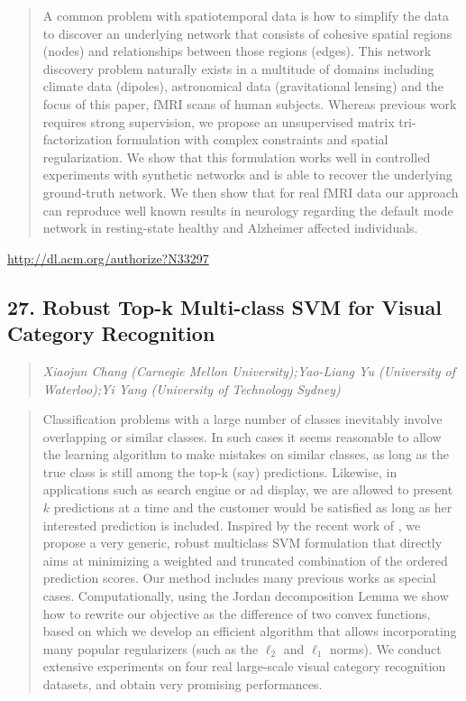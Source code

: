 \documentclass{article}
\begin{document}
\begin{quote}
A common problem with spatiotemporal data is how to simplify the data to discover an underlying network that consists of cohesive spatial regions (nodes) and relationships between those regions (edges). This network discovery problem naturally exists in a multitude of domains including climate data (dipoles), astronomical data (gravitational lensing) and the focus of this paper, fMRI scans of human subjects. Whereas previous work requires strong supervision, we propose an unsupervised matrix tri-factorization formulation with complex constraints and spatial regularization. We show that this formulation works well in controlled experiments with synthetic networks and is able to recover the underlying ground-truth network. We then show that for real fMRI data our approach can reproduce well known results in neurology regarding the default mode network in resting-state healthy and Alzheimer affected individuals.
\end{quote}

\href{http://dl.acm.org/authorize?N33297}{http://dl.acm.org/authorize?N33297}

\subsection{27. Robust Top-k Multi-class SVM for Visual Category Recognition}

\begin{quote}
\footnotesize{\textit{Xiaojun Chang (Carnegie Mellon University);Yao-Liang Yu (University of Waterloo);Yi Yang (University of Technology Sydney)}}

\end{quote}

\begin{quote}
Classification problems with a large number of classes inevitably involve overlapping or similar classes. In such cases it seems reasonable to allow the learning algorithm to make mistakes on similar classes, as long as the true class is still among the top-k (say) predictions. Likewise, in applications such as search engine or ad display, we are allowed to present $k$ predictions at a time and the customer would be satisfied as long as her interested prediction is included. Inspired by the recent work of \cite{LapinSH15}, we propose a very generic, robust multiclass SVM formulation that directly aims at minimizing a weighted and truncated combination of the ordered prediction scores. Our method includes many previous works as special cases. Computationally, using the Jordan decomposition Lemma we show how to rewrite our objective as the difference of two convex functions, based on which we develop an efficient algorithm that allows incorporating many popular regularizers (such as the $\ell_2$ and $\ell_1$ norms). We conduct extensive experiments on four real large-scale visual category recognition datasets, and obtain very promising performances.
\end{quote}
\end{document}
